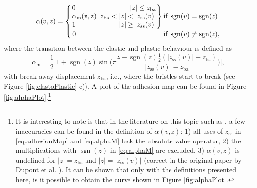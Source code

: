 \documentclass[twoside,a4paper,dvipsnames]{article}
\newenvironment{rcases}
  {\left.\begin{alignedat}{2}}
  {\end{alignedat}\right\rbrace}
\DeclareMathOperator{\sgn}{sgn}
\begin{document}
\begin{equation}\label{eq:adhesionMap}
\alpha(v, z) = 
\begin{aligned}
    \begin{cases}
    \begin{rcases}
        &0 & |z| \leq z_\text{ba}\\
       &\alpha_\text{m}(v,z)&\ \, z_\text{ba}<|z|<|z_\text{ss}(v)|\\        &1 &|z|\geq|z_\text{ss}(v)|
        \end{rcases} 
        
        &\!\!\!\!\!\text{if}\  \sgn(v)=\sgn(z)\\
        \,0&\!\!\!\!\!\text{if}\  \sgn(v)\neq\sgn(z),
    \end{cases}
    \end{aligned}
\end{equation}
where the transition between the elastic and plastic behaviour is defined as
\begin{equation}\label{eq:alphaM}
    \alpha_\text{m} = \frac{1}{2}\bigg[1+\sgn(z)\sin\bigg(\pi\frac{z-\sgn(z)\frac{1}{2}(|z_\text{ss}(v)|+z_\text{ba})}{|z_\text{ss}(v)|-z_\text{ba}}\bigg)\bigg],
\end{equation}
with break-away displacement $z_\text{ba}$, i.e., where the bristles start to break (see Figure \ref{fig:elastoPlastic} c)). A plot of the adhesion map can be found in Figure \ref{fig:alphaPlot}.\footnote{It is interesting to note is that in the literature on this topic such as \cite{Dupont2002, Serafin2004, Serafin2003, Avanzini2005}, a few inaccuracies can be found in the definition of $\alpha(v,z)$: 1) all uses of $z_\text{ss}$ in \eqref{eq:adhesionMap} and \eqref{eq:alphaM} lack the absolute value operator, 2) the multiplications with $\sgn(z)$ in \eqref{eq:alphaM} are excluded, 3) $\alpha(v,z)$ is undefined for $|z|=z_\text{ba}$ and $|z|=|z_\text{ss}(v)|$ (correct in the original paper by Dupont et al. \cite{Dupont2002}). It can be shown that only with the definitions presented here, is it possible to obtain the curve shown in Figure \ref{fig:alphaPlot}.}
\end{document}
